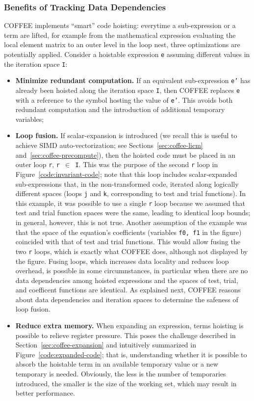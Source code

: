 \subsubsection{Benefits of Tracking Data Dependencies}
COFFEE implements ``smart'' code hoisting: everytime a sub-expression or a term are lifted, for example from the mathematical expression evaluating the local element matrix to an outer level in the loop nest, three optimizations are potentially applied. Consider a hoistable expression \texttt{e} assuming different values in the iteration space \texttt{I}:
\begin{itemize}
\item \textbf{Minimize redundant computation.} If an equivalent sub-expression \texttt{e'} has already been hoisted along the iteration space \texttt{I}, then COFFEE replaces \texttt{e} with a reference to the symbol hosting the value of \texttt{e'}. This avoids both redundant computation and the introduction of additional temporary variables;
\item \textbf{Loop fusion.} If scalar-expansion is introduced (we recall this is useful to achieve SIMD auto-vectorization; see Sections~\ref{sec:coffee-licm} and~\ref{sec:coffee-precompute}), then the hoisted code must be placed in an outer loop \texttt{r}, \texttt{r $\in$ I}. This was the purpose of the second \texttt{r} loop in Figure~\ref{code:invariant-code}; note that this loop includes scalar-expanded sub-expressions that, in the non-transformed code, iterated along logically different spaces (loops \texttt{j} and \texttt{k}, corresponding to test and trial functions). In this example, it was possible to use a single \texttt{r} loop because we assumed that test and trial function spaces were the same, leading to identical loop bounds; in general, however, this is not true. Another assumption of the example was that the space of the equation's coefficients (variables \texttt{f0, f1} in the figure) coincided with that of test and trial functions. This would allow fusing the two \texttt{r} loops, which is exactly what COFFEE does, although not displayed by the figure. Fusing loops, which increases data locality and reduces loop overhead, is possible in some circumnstances, in particular when there are no data dependencies among hoisted expressions and the spaces of test, trial, and coefficent functions are identical. As explained next, COFFEE reasons about data dependencies and iteration spaces to determine the safeness of loop fusion.
\item \textbf{Reduce extra memory.} When expanding an expression, terms hoisting is possible to relieve register pressure. This poses the challenge described in Section~\ref{sec:coffee-expansion} and intuitively summarized in Figure~\ref{code:expanded-code}; that is, understanding whether it is possible to absorb the hoistable term in an available temporary value or a new temporary is needed. Obviously, the less is the number of temporaries introduced, the smaller is the size of the working set, which may result in better performance.
\end{itemize}
